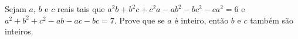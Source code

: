 Sejam $a$, $b$ e $c$ reais tais que $a^2 b + b^2 c + c^2 a - ab^2 - bc^2 - ca^2 = 6$ e $a^2 + b^2 + c^2 - ab - ac - bc = 7$. Prove que se $a$ é inteiro, então $b$ e $c$ também são inteiros.
